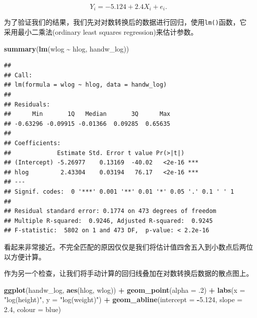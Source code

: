 \documentclass[
]{book}
\newenvironment{Shaded}{\begin{snugshade}}{\end{snugshade}}
\newcommand{\AttributeTok}[1]{\textcolor[rgb]{0.13,0.29,0.53}{#1}}
\newcommand{\DecValTok}[1]{\textcolor[rgb]{0.00,0.00,0.81}{#1}}
\newcommand{\FloatTok}[1]{\textcolor[rgb]{0.00,0.00,0.81}{#1}}
\newcommand{\FunctionTok}[1]{\textcolor[rgb]{0.13,0.29,0.53}{\textbf{#1}}}
\newcommand{\NormalTok}[1]{#1}
\newcommand{\SpecialCharTok}[1]{\textcolor[rgb]{0.81,0.36,0.00}{\textbf{#1}}}
\newcommand{\StringTok}[1]{\textcolor[rgb]{0.31,0.60,0.02}{#1}}
\begin{document}
\[Y_i =  -5.124 + 2.4X_i + e_i.\]

为了验证我们的结果，我们先对对数转换后的数据进行回归，使用\texttt{lm()}函数，它采用最小二乘法(ordinary least squares regression)来估计参数。

\begin{Shaded}
\begin{Highlighting}[]
\FunctionTok{summary}\NormalTok{(}\FunctionTok{lm}\NormalTok{(wlog }\SpecialCharTok{\textasciitilde{}}\NormalTok{ hlog, handw\_log))}
\end{Highlighting}
\end{Shaded}

\begin{verbatim}
## 
## Call:
## lm(formula = wlog ~ hlog, data = handw_log)
## 
## Residuals:
##      Min       1Q   Median       3Q      Max 
## -0.63296 -0.09915 -0.01366  0.09285  0.65635 
## 
## Coefficients:
##             Estimate Std. Error t value Pr(>|t|)    
## (Intercept) -5.26977    0.13169  -40.02   <2e-16 ***
## hlog         2.43304    0.03194   76.17   <2e-16 ***
## ---
## Signif. codes:  0 '***' 0.001 '**' 0.01 '*' 0.05 '.' 0.1 ' ' 1
## 
## Residual standard error: 0.1774 on 473 degrees of freedom
## Multiple R-squared:  0.9246, Adjusted R-squared:  0.9245 
## F-statistic:  5802 on 1 and 473 DF,  p-value: < 2.2e-16
\end{verbatim}

看起来非常接近。不完全匹配的原因仅仅是我们将估计值四舍五入到小数点后两位以方便计算。

作为另一个检查，让我们将手动计算的回归线叠加在对数转换后数据的散点图上。

\begin{Shaded}
\begin{Highlighting}[]
\FunctionTok{ggplot}\NormalTok{(handw\_log, }\FunctionTok{aes}\NormalTok{(hlog, wlog)) }\SpecialCharTok{+}
  \FunctionTok{geom\_point}\NormalTok{(}\AttributeTok{alpha =}\NormalTok{ .}\DecValTok{2}\NormalTok{) }\SpecialCharTok{+}
  \FunctionTok{labs}\NormalTok{(}\AttributeTok{x =} \StringTok{"log(height)"}\NormalTok{, }\AttributeTok{y =} \StringTok{"log(weight)"}\NormalTok{) }\SpecialCharTok{+}
  \FunctionTok{geom\_abline}\NormalTok{(}\AttributeTok{intercept =} \SpecialCharTok{{-}}\FloatTok{5.124}\NormalTok{, }\AttributeTok{slope =} \FloatTok{2.4}\NormalTok{, }\AttributeTok{colour =} \StringTok{\textquotesingle{}blue\textquotesingle{}}\NormalTok{)}
\end{Highlighting}
\end{Shaded}
\end{document}

